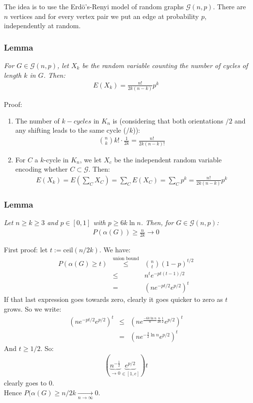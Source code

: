 The idea is to use the Erdö's-Renyi model of random graphs $\mathcal{G}(n,p)$. There are $n$ vertices and for every vertex pair we put an edge at probability $p$, independently at random. 

\subsubsection{Lemma}
\textit{For $G \in \mathcal{G}(n,p)$, let $X_k$ be the random variable counting the number of cycles of length $k$ in $G$. Then:}
\begin{eqnarray}
	E(X_k) = \frac{n!}{2k(n-k)} p^k
\end{eqnarray}

Proof:
\begin{enumerate}
	\item The number of $k-cycles$ in $K_n$ is (considering that both orientations $/2$ and any shifting leads to the same cycle ($/k$)):
	\begin{eqnarray}
		{{n}\choose{k}} k! \cdot \frac{1}{2k} = \frac{n!}{2k(n-k)!}
	\end{eqnarray}
	\item For $C$ a $k$-cycle in $K_n$, we let $X_c$ be the independent random variable encoding whether $C \subset \mathcal{G}$. Then:
	\begin{eqnarray}
		E(X_k) = E(\sum_C X_C) = \sum_C E(X_C) = \sum_C p^k = \frac{n!}{2k(n-k)} p^k
	\end{eqnarray}
\end{enumerate}

\subsubsection{Lemma}
\textit{Let $n \geq k \geq 3$ and $p \in [0,1]$ with $p \geq 6k \ln n$. Then, for $G \in \mathcal{G}(n,p)$:}
\begin{eqnarray}
	P(\alpha(G)) \geq \frac{n}{2k} \rightarrow 0
\end{eqnarray}

First proof: let $t := \text{ceil}(n/2k)$. We have:
\begin{eqnarray}
	P(\alpha(G) \geq t) &\overset{\text{union bound}}\leq& {{n}\choose{t}} (1 - p)^{t/2} \\
	&\leq& n^t e^{-pt(t-1)/2} \\
	&=& (ne^{-pt/2}e^{p/2})^t
\end{eqnarray}
If that last expression goes towards zero, clearly it goes quicker to zero as $t$ grows. So we write:
\begin{eqnarray}
	(ne^{-pt/2}e^{p/2})^t &\leq& (ne^{\frac{-6k\ln n}{n} \frac{n}{2k} \frac{1}{2}} e^{p/2})^t \\
	&=& (ne^{-\frac{3}{2} \ln n} e^{p/2})^t
\end{eqnarray}
And $t \geq 1/2$. So:
\begin{eqnarray}
	(\underbrace{n^{-\frac{1}{2}}}_{\rightarrow 0}  \underbrace{e^{p/2}}_{\in [1,e]})t
\end{eqnarray}
clearly goes to 0.\\
Hence $P(\alpha(G) \geq n/2k \underset{n \rightarrow \infty}\rightarrow 0$.\\

